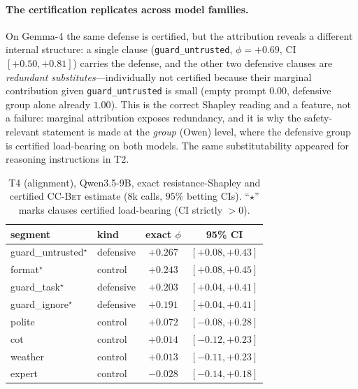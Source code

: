\documentclass[10pt,twocolumn,letterpaper]{article}
\theoremstyle{plain}
\theoremstyle{definition}
\newcommand{\shap}{\phi}
\begin{document}
\paragraph{The certification replicates across model families.} On Gemma-4 the
same defense is certified, but the attribution reveals a different internal
structure: a single clause (\texttt{guard\_untrusted}, $\shap=+0.69$, CI
$[+0.50,+0.81]$) carries the defense, and the other two defensive clauses are
\emph{redundant substitutes}---individually not certified because their marginal
contribution given \texttt{guard\_untrusted} is small (empty prompt $0.00$,
defensive group alone already $1.00$). This is the correct Shapley reading and a
feature, not a failure: marginal attribution exposes redundancy, and it is why
the safety-relevant statement is made at the \emph{group} (Owen) level, where
the defensive group is certified load-bearing on both models. The same
substitutability appeared for reasoning instructions in T2.

\begin{table}[t]
\centering\small
\caption{T4 (alignment), Qwen3.5-9B, exact resistance-Shapley and certified
\textsc{CC-Bet} estimate ($8$k calls, $95\%$ betting CIs). ``$\star$'' marks
clauses certified load-bearing (CI strictly $>0$).}
\label{tab:t4}
\begin{tabular}{llcc}
\toprule
segment & kind & exact $\shap$ & 95\% CI \\
\midrule
guard\_untrusted$^\star$ & defensive & $+0.267$ & $[+0.08,+0.43]$ \\
format$^\star$           & control   & $+0.243$ & $[+0.08,+0.45]$ \\
guard\_task$^\star$      & defensive & $+0.203$ & $[+0.04,+0.41]$ \\
guard\_ignore$^\star$    & defensive & $+0.191$ & $[+0.04,+0.41]$ \\
polite                   & control   & $+0.072$ & $[-0.08,+0.28]$ \\
cot                      & control   & $+0.014$ & $[-0.12,+0.23]$ \\
weather                  & control   & $+0.013$ & $[-0.11,+0.23]$ \\
expert                   & control   & $-0.028$ & $[-0.14,+0.18]$ \\
\bottomrule
\end{tabular}
\end{table}
\end{document}
